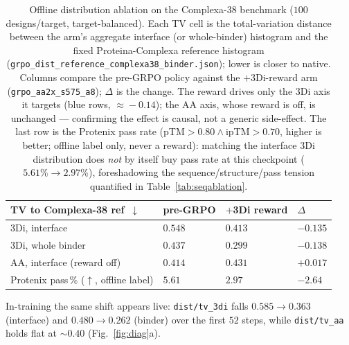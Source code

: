 \documentclass[11pt]{article}
\newcommand{\ttk}[1]{\texttt{\small #1}}
\begin{document}
\begin{table}[htbp]
\centering
{\renewcommand{\arraystretch}{1.2}%
\begin{tabular}{@{}>{\raggedright\arraybackslash}p{6.4cm}
                    >{\centering\arraybackslash}p{2.3cm}
                    >{\centering\arraybackslash}p{2.3cm}
                    >{\centering\arraybackslash}p{1.7cm}@{}}
\toprule
\textbf{TV to Complexa-38 ref}\ $\downarrow$ & \textbf{pre-GRPO} & \textbf{$+$3Di reward} & \textbf{$\Delta$}\\
\midrule
\rowcolor{dTint}3Di, interface           & $0.548$ & $0.413$ & $-0.135$\\
\rowcolor{dTint}3Di, whole binder        & $0.437$ & $0.299$ & $-0.138$\\
AA, interface \small(reward off)         & $0.414$ & $0.431$ & $+0.017$\\
\midrule
Protenix pass\,\% \small($\uparrow$, offline label) & $5.61$ & $2.97$ & $-2.64$\\
\bottomrule
\end{tabular}}
\caption{Offline distribution ablation on the Complexa-38 benchmark ($100$ designs/target,
target-balanced). Each TV cell is the total-variation distance between the arm's aggregate
interface (or whole-binder) histogram and the fixed Proteina-Complexa reference histogram
(\ttk{grpo\_dist\_reference\_complexa38\_binder.json}); lower is closer to native. Columns compare
the pre-GRPO policy against the $+$3Di-reward arm (\ttk{grpo\_aa2x\_s575\_a8}); $\Delta$ is the change. The reward drives only
the 3Di axis it targets (\textcolor{dLine}{blue} rows, $\approx\!-0.14$); the AA axis, whose reward is off, is
unchanged --- confirming the effect is causal, not a generic side-effect. The last row is the
Protenix pass rate (pTM$>\!0.80\wedge$ipTM$>\!0.70$, higher is better; offline label only, never a
reward): matching the interface 3Di distribution does \emph{not} by itself buy pass rate at this
checkpoint ($5.61\%\!\to\!2.97\%$), foreshadowing the sequence/structure/pass tension quantified in
Table~\ref{tab:seqablation}.}
\label{tab:distablation}
\end{table}
In-training the same shift appears live: \ttk{dist/tv\_3di} falls $0.585\!\to\!0.363$
(interface) and $0.480\!\to\!0.262$ (binder) over the first $52$ steps, while \ttk{dist/tv\_aa}
holds flat at $\sim\!0.40$ (Fig.~\ref{fig:diag}a).
\end{document}
